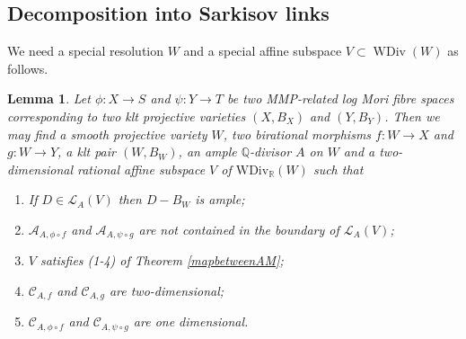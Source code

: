 \documentclass[11pt]{amsart}
\newtheorem{lem}[defn]{Lemma}
\begin{document}
\subsection{Decomposition into Sarkisov links}
We need a special resolution $W$ and a special affine subspace $V \subset \operatorname{WDiv}(W)$ as follows.

\begin{lem}\label{keylemma}
  \cite[Lemma 4.1]{haconSarkisovProgram2012} Let $ \phi: X \to S $ and $ \psi: Y\to T  $ be two MMP-related log Mori fibre spaces corresponding to two klt projective varieties $ (X, B_X) $ and $ (Y, B_Y) $. Then we may find a smooth projective variety $ W $, two birational morphisms $ f:W\to X $ and $ g:W\to Y $, a klt pair $ (W,B_{W}) $, an ample $ \mathbb{Q} $-divisor $ A $ on $ W $ and a two-dimensional rational affine subspace $ V $ of $ \mathrm{WDiv}_\mathbb{R}(W) $ such that
  \begin{enumerate}
    \item If $ D\in \mathcal{L}_A(V) $ then $ D-B_W $ is ample;
    \item $ \mathcal{A}_{A,\phi\circ f} $ and $ \mathcal{A}_{A,\psi\circ g} $ are not contained in the boundary of $ \mathcal{L}_A(V) $;
    \item $ V $ satisfies (1-4) of Theorem \ref{mapbetweenAM};
    \item $ \mathcal{C}_{A,f} $ and $ \mathcal{C}_{A,g} $ are two-dimensional;
    \item $ \mathcal{C}_{A,\phi\circ f} $ and $ \mathcal{C}_{A,\psi\circ g} $ are one dimensional.
  \end{enumerate}
\end{lem}
\end{document}
